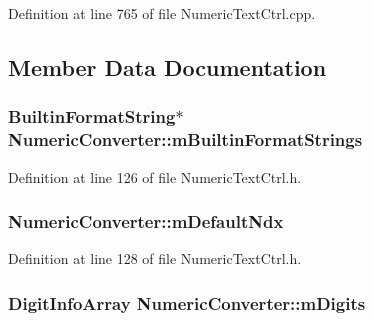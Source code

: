 Definition at line 765 of file Numeric\+Text\+Ctrl.\+cpp.



\subsection{Member Data Documentation}
\subsubsection[{\texorpdfstring{m\+Builtin\+Format\+Strings}{mBuiltinFormatStrings}}]{ {\bf Builtin\+Format\+String}$\ast$ Numeric\+Converter\+::m\+Builtin\+Format\+Strings\hspace{0.3cm}{\ttfamily [protected]}}\hypertarget{class_numeric_converter_a23cf31487edd5025c2d6d7307d3b8a74}{}\label{class_numeric_converter_a23cf31487edd5025c2d6d7307d3b8a74}


Definition at line 126 of file Numeric\+Text\+Ctrl.\+h.

\subsubsection[{\texorpdfstring{m\+Default\+Ndx}{mDefaultNdx}}]{ Numeric\+Converter\+::m\+Default\+Ndx\hspace{0.3cm}{\ttfamily [protected]}}\hypertarget{class_numeric_converter_a5e2284c54a19173769adac4e3b22e43f}{}\label{class_numeric_converter_a5e2284c54a19173769adac4e3b22e43f}


Definition at line 128 of file Numeric\+Text\+Ctrl.\+h.

\subsubsection[{\texorpdfstring{m\+Digits}{mDigits}}]{\setlength{\rightskip}{0pt plus 5cm}Digit\+Info\+Array Numeric\+Converter\+::m\+Digits\hspace{0.3cm}{\ttfamily [protected]}}\hypertarget{class_numeric_converter_ab88999aa38ecf654f6f0da79ea3f9dcc}{}\label{class_numeric_converter_ab88999aa38ecf654f6f0da79ea3f9dcc}


